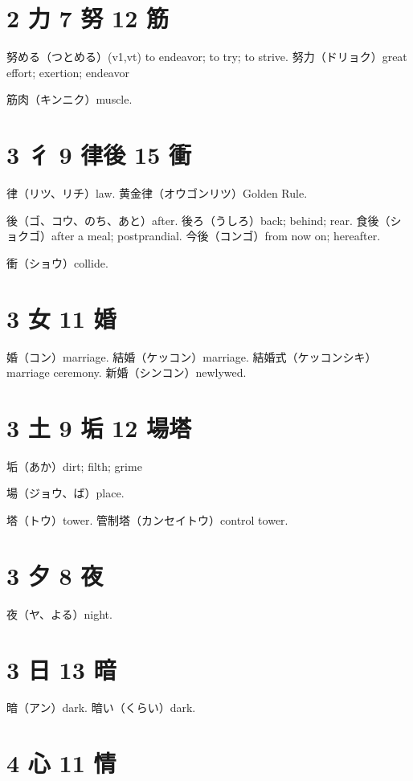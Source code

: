 \section{2 力 7 努 12 筋}

努める（つとめる）(v1,vt) to endeavor; to try; to strive.
努力（ドリョク）great effort; exertion; endeavor

筋肉（キンニク）muscle.

\section{3 彳 9 律後 15 衝}

律（リツ、リチ）law.
黄金律（オウゴンリツ）Golden Rule.

後（ゴ、コウ、のち、あと）after.
後ろ（うしろ）back; behind; rear.
食後（ショクゴ）after a meal; postprandial.
今後（コンゴ）from now on; hereafter.

衝（ショウ）collide.

\section{3 女 11 婚}

婚（コン）marriage.
結婚（ケッコン）marriage.
結婚式（ケッコンシキ）marriage ceremony.
新婚（シンコン）newlywed.

\section{3 土 9 垢 12 場塔}

垢（あか）dirt; filth; grime

場（ジョウ、ば）place.

塔（トウ）tower.
管制塔（カンセイトウ）control tower.

\section{3 夕 8 夜}

夜（ヤ、よる）night.

\section{3 日 13 暗}

暗（アン）dark.
暗い（くらい）dark.

\section{4 心 11 情}

